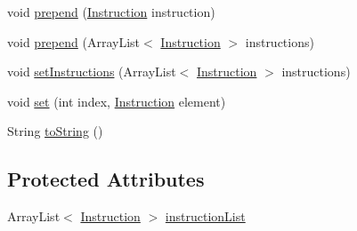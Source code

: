 \begin{DoxyCompactItemize}
void \hyperlink{classcas_1_1parser_1_1parser__containers_1_1_code_list_aa9cf24f683ecf4c7dda2c70581f9a502}{prepend} (\hyperlink{classcas_1_1instruction_1_1_instruction}{Instruction} instruction)
\item 
void \hyperlink{classcas_1_1parser_1_1parser__containers_1_1_code_list_a1f72f45876ccba2fef50a3c83e2b1f0c}{prepend} (Array\-List$<$ \hyperlink{classcas_1_1instruction_1_1_instruction}{Instruction} $>$ instructions)
\item 
void \hyperlink{classcas_1_1parser_1_1parser__containers_1_1_code_list_af0055068ffe6784b0ed4c26d2c5b28b7}{set\-Instructions} (Array\-List$<$ \hyperlink{classcas_1_1instruction_1_1_instruction}{Instruction} $>$ instructions)
\item 
void \hyperlink{classcas_1_1parser_1_1parser__containers_1_1_code_list_a596cb7a533ed8b2691463bb9cf80188c}{set} (int index, \hyperlink{classcas_1_1instruction_1_1_instruction}{Instruction} element)
\item 
String \hyperlink{classcas_1_1parser_1_1parser__containers_1_1_code_list_a9e5369166a1c95cc564cb0d5ee110906}{to\-String} ()
\end{DoxyCompactItemize}
\subsection*{Protected Attributes}
\begin{DoxyCompactItemize}
\item 
Array\-List$<$ \hyperlink{classcas_1_1instruction_1_1_instruction}{Instruction} $>$ \hyperlink{classcas_1_1parser_1_1parser__containers_1_1_code_list_a4a93e4fcdc23551521463643f0ecb1a3}{instruction\-List}
\end{DoxyCompactItemize}


